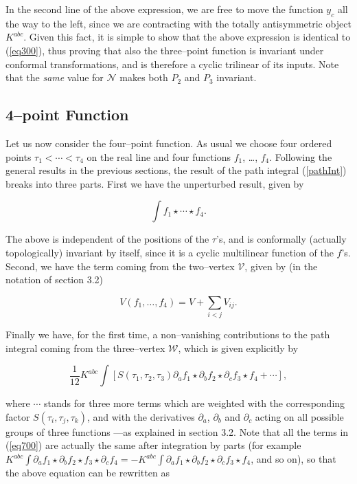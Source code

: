 \documentclass[a4paper,11pt]{article}
\begin{document}
\noindent
In the second line of the above expression, we are free to move the
function $y_{c}$ all the way to the left, since we are contracting with the
totally antisymmetric object $K^{abc}$. Given this fact, it is simple to
show that the above expression is identical to (\ref{eq300}), thus proving
that also the three--point function is invariant under conformal
transformations, and is therefore a cyclic trilinear of its inputs. Note
that the \textit{same} value for $\mathcal{N}$ makes both $P_{2}$ and
$P_{3}$ invariant.


\subsection{4--point Function}


Let us now consider the four--point function. As usual we choose four
ordered points $\tau_{1} < \cdots < \tau_{4}$ on the real line and four
functions $f_{1}$, \dots, $f_{4}$. Following the general results in the
previous sections, the result of the path integral (\ref{pathInt}) breaks
into three parts. First we have the unperturbed result, given by

$$
\int f_{1} \star \cdots \star f_{4}.
$$

\noindent
The above is independent of the positions of the $\tau $'s, and is
conformally (actually topologically) invariant by itself, since it is a
cyclic multilinear function of the $f$'s. Second, we have the term coming
from the two--vertex $\mathcal{V}$, given by (in the notation of section 
3.2) 

\begin{equation}
V\left( f_{1}, \dots, f_{4}\right) =V+\sum_{i<j}V_{ij} . \label{eq800}
\end{equation}

\noindent
Finally we have, for the first time, a non--vanishing contributions to the
path integral coming from the three--vertex $\mathcal{W}$, which is given
explicitly by

\begin{equation}
\frac{1}{12}K^{abc}\int \left[ S\left( \tau _{1},\tau _{2},\tau _{3}\right)
\partial _{a}f_{1}\star \partial _{b}f_{2}\star \partial _{c}f_{3}\star
f_{4}+\cdots \right] ,  \label{eq700}
\end{equation}

\noindent
where $\cdots$ stands for three more terms which are weighted with the
corresponding factor $S\left( \tau _{i},\tau _{j},\tau _{k}\right)$, and
with the derivatives $\partial_{a}$, $\partial_{b}$ and $\partial _{c}$
acting on all possible groups of three functions ---as explained in 
section 3.2. Note that all the terms in (\ref{eq700}) are actually the same 
after integration by parts (for example $K^{abc}\int \partial _{a}f_{1}\star 
\partial _{b}f_{2}\star f_{3}\star \partial _{c}f_{4}=-K^{abc}\int 
\partial_{a}f_{1}\star \partial_{b}f_{2}\star \partial _{c}f_{3}\star 
f_{4}$, and so on), so that the above equation can be rewritten as 
\end{document}
